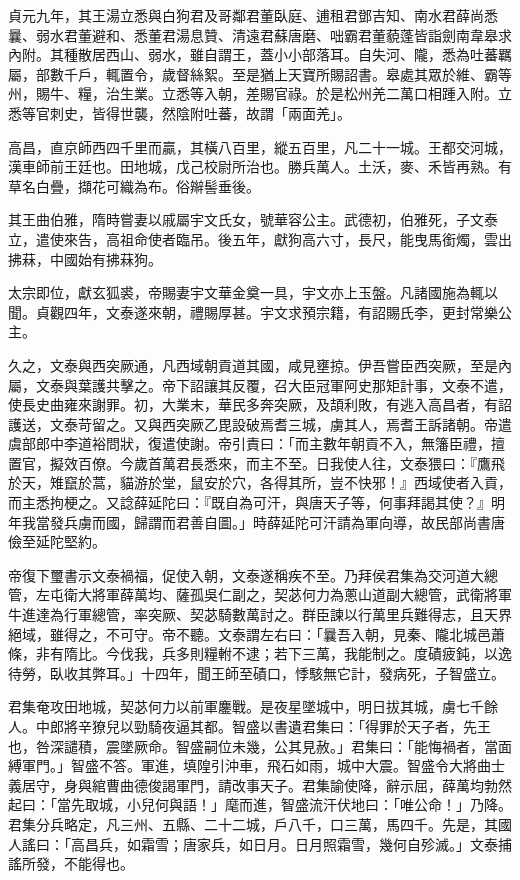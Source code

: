 \begin{pinyinscope}
 貞元九年，其王湯立悉與白狗君及哥鄰君董臥庭、逋租君鄧吉知、南水君薛尚悉曩、弱水君董避和、悉董君湯息贊、清遠君蘇唐磨、咄霸君董藐蓬皆詣劍南韋皋求內附。其種散居西山、弱水，雖自謂王，蓋小小部落耳。自失河、隴，悉為吐蕃羈屬，部數千戶，輒置令，歲督絲絮。至是猶上天寶所賜詔書。皋處其眾於維、霸等州，賜牛、糧，治生業。立悉等入朝，差賜官祿。於是松州羌二萬口相踵入附。立悉等官刺史，皆得世襲，然陰附吐蕃，故謂「兩面羌」。



 高昌，直京師西四千里而贏，其橫八百里，縱五百里，凡二十一城。王都交河城，漢車師前王廷也。田地城，戊己校尉所治也。勝兵萬人。土沃，麥、禾皆再熟。有草名白疊，擷花可織為布。俗辮髻垂後。



 其王曲伯雅，隋時嘗妻以戚屬宇文氏女，號華容公主。武德初，伯雅死，子文泰立，遣使來告，高祖命使者臨吊。後五年，獻狗高六寸，長尺，能曳馬銜燭，雲出拂菻，中國始有拂菻狗。



 太宗即位，獻玄狐裘，帝賜妻宇文華金奠一具，宇文亦上玉盤。凡諸國施為輒以聞。貞觀四年，文泰遂來朝，禮賜厚甚。宇文求預宗籍，有詔賜氏李，更封常樂公主。



 久之，文泰與西突厥通，凡西域朝貢道其國，咸見壅掠。伊吾嘗臣西突厥，至是內屬，文泰與葉護共擊之。帝下詔讓其反覆，召大臣冠軍阿史那矩計事，文泰不遣，使長史曲雍來謝罪。初，大業末，華民多奔突厥，及頡利敗，有逃入高昌者，有詔護送，文泰苛留之。又與西突厥乙毘設破焉耆三城，虜其人，焉耆王訴諸朝。帝遣虞部郎中李道裕問狀，復遣使謝。帝引責曰：「而主數年朝貢不入，無籓臣禮，擅置官，擬效百僚。今歲首萬君長悉來，而主不至。日我使人往，文泰猥曰：『鷹飛於天，雉竄於蒿，貓游於堂，鼠安於穴，各得其所，豈不快邪！』西域使者入貢，而主悉拘梗之。又諗薛延陀曰：『既自為可汗，與唐天子等，何事拜謁其使？』明年我當發兵虜而國，歸謂而君善自圖。」時薛延陀可汗請為軍向導，故民部尚書唐儉至延陀堅約。



 帝復下璽書示文泰禍福，促使入朝，文泰遂稱疾不至。乃拜侯君集為交河道大總管，左屯衛大將軍薛萬均、薩孤吳仁副之，契苾何力為蔥山道副大總管，武衛將軍牛進達為行軍總管，率突厥、契苾騎數萬討之。群臣諫以行萬里兵難得志，且天界絕域，雖得之，不可守。帝不聽。文泰謂左右曰：「曩吾入朝，見秦、隴北城邑蕭條，非有隋比。今伐我，兵多則糧軵不逮；若下三萬，我能制之。度磧疲鈍，以逸待勞，臥收其弊耳。」十四年，聞王師至磧口，悸駭無它計，發病死，子智盛立。



 君集奄攻田地城，契苾何力以前軍鏖戰。是夜星墜城中，明日拔其城，虜七千餘人。中郎將辛獠兒以勁騎夜逼其都。智盛以書遺君集曰：「得罪於天子者，先王也，咎深譴積，震墜厥命。智盛嗣位未幾，公其見赦。」君集曰：「能悔禍者，當面縛軍門。」智盛不答。軍進，填隍引沖車，飛石如雨，城中大震。智盛令大將曲士義居守，身與綰曹曲德俊謁軍門，請改事天子。君集諭使降，辭示屈，薛萬均勃然起曰：「當先取城，小兒何與語！」麾而進，智盛流汗伏地曰：「唯公命！」乃降。君集分兵略定，凡三州、五縣、二十二城，戶八千，口三萬，馬四千。先是，其國人謠曰：「高昌兵，如霜雪；唐家兵，如日月。日月照霜雪，幾何自殄滅。」文泰捕謠所發，不能得也。




\end{pinyinscope}
